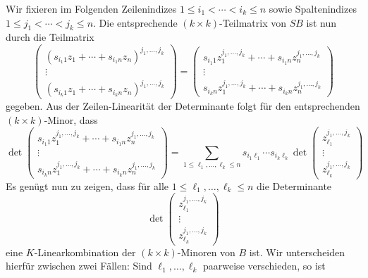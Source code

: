 Wir fixieren im Folgenden Zeilenindizes $1 \leq i_1 < \dotsb < i_k \leq n$ sowie Spaltenindizes $1 \leq j_1 < \dotsb < j_k \leq n$.
Die entsprechende $(k \times k)$-Teilmatrix von $SB$ ist nun durch die Teilmatrix
\[
    \begin{pmatrix}
      (s_{i_1 1} z_1 + \dotsb + s_{i_1 n} z_n)^{j_1, \dotsc, j_k} \\
      \vdots                                                      \\
      (s_{i_k 1} z_1 + \dotsb + s_{i_k n} z_n)^{j_1, \dotsc, j_k}
    \end{pmatrix}
  = \begin{pmatrix}
      s_{i_1 1} z_1^{j_1, \dotsc, j_k} + \dotsb + s_{i_1 n} z_n^{j_1, \dotsc, j_k}  \\
      \vdots                                                                        \\
      s_{i_k n} z_1^{j_1, \dotsc, j_k} + \dotsb + s_{i_k n} z_n^{j_1, \dotsc, j_k}
    \end{pmatrix}
\]
gegeben.
Aus der Zeilen-Linearität der Determinante folgt für den entsprechenden $(k \times k)$-Minor, dass
\[
    \det
    \begin{pmatrix}
      s_{i_1 1} z_1^{j_1, \dotsc, j_k} + \dotsb + s_{i_1 n} z_n^{j_1, \dotsc, j_k}  \\
      \vdots                                                                        \\
      s_{i_k n} z_1^{j_1, \dotsc, j_k} + \dotsb + s_{i_k n} z_n^{j_1, \dotsc, j_k}
    \end{pmatrix}
  = \sum_{1 \leq \ell_1, \dotsc, \ell_k \leq n}
    s_{i_1 \ell_1} \dotsm s_{i_k \ell_k}
    \det
    \begin{pmatrix}
      z_{\ell_1}^{j_1, \dotsc, j_k} \\
      \vdots                        \\
      z_{\ell_k}^{j_1, \dotsc, j_k}
    \end{pmatrix}
\]
Es genügt nun zu zeigen, dass für alle $1 \leq \ell_1, \dotsc, \ell_k \leq n$ die Determinante
\[
  \det
  \begin{pmatrix}
    z_{\ell_1}^{j_1, \dotsc, j_k} \\
    \vdots                        \\
    z_{\ell_k}^{j_1, \dotsc, j_k}
  \end{pmatrix}
\]
eine $K$-Linearkombination der $(k \times k)$-Minoren von $B$ ist.
Wir unterscheiden hierfür zwischen zwei Fällen:
Sind $\ell_1, \dotsc, \ell_k$ paarweise verschieden, so ist

